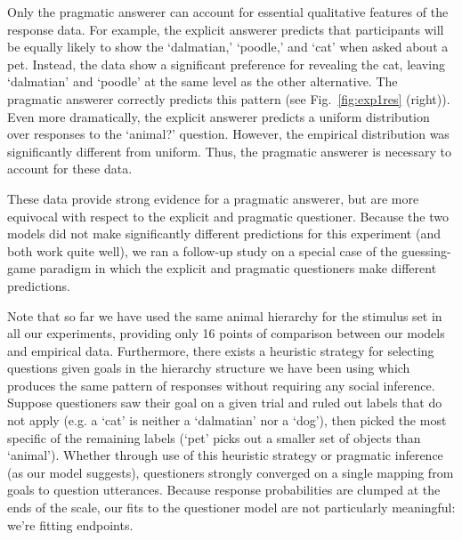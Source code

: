 \documentclass[12pt, floatsintext, jou]{apa6}
\begin{document}
Only the pragmatic answerer can account for essential qualitative features of the response data. For example, the explicit answerer predicts that participants will be equally likely to show the `dalmatian,' `poodle,' and `cat' when asked about a pet. Instead, the data show a significant preference for revealing the cat, leaving `dalmatian' and `poodle' at the same level as the other alternative. The pragmatic answerer correctly predicts this pattern  (see Fig.~\ref{fig:exp1res} (right)). Even more dramatically, the explicit answerer predicts a uniform distribution over responses to the `animal?' question. %
However, the empirical distribution was significantly different from uniform. Thus, the pragmatic answerer is necessary to account for these data.

These data provide strong evidence for a pragmatic answerer, but are more equivocal with respect to the explicit and pragmatic questioner. Because the two models did not make significantly different predictions for this experiment (and both work quite well), we ran a follow-up study on a special case of the guessing-game paradigm in which the explicit and pragmatic questioners make different predictions.

Note that so far we have used the same animal hierarchy for the stimulus set in all our experiments, providing only 16 points of comparison between our models and empirical data. Furthermore, there exists a heuristic strategy for selecting questions given goals in the hierarchy structure we have been using which produces the same pattern of responses without requiring any social inference. Suppose questioners saw their goal on a given trial and ruled out labels that do not apply (e.g. a `cat' is neither a `dalmatian' nor a `dog'), then picked the most specific of the remaining labels (`pet' picks out a smaller set of objects than `animal'). Whether through use of this heuristic strategy or pragmatic inference (as our model suggests), questioners strongly converged on a single mapping from goals to question utterances. Because response probabilities are clumped at the ends of the scale, our fits to the questioner model are not particularly meaningful: we're fitting endpoints.
 
\end{document}
